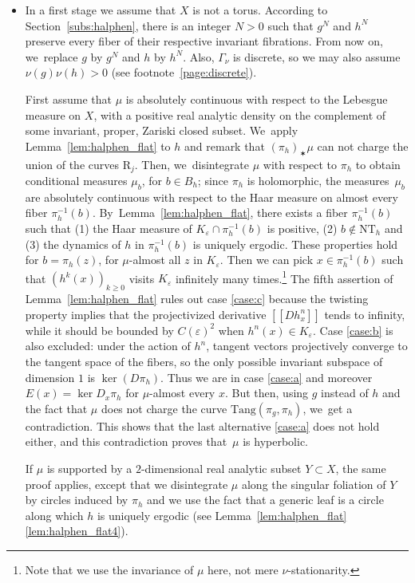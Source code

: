 \documentclass[JEP,XML,SOM,Unicode,published]{cedram}
\newcommand{\llbracket}{[\![}
\newcommand{\rrbracket}{]\!]}
\let\e\varepsilon
\newcommand{\inv}{^{-1}}
\newcommand{\Tang}{{\mathrm{Tang}}}
\theoremstyle{plain}
\theoremstyle{definition}
\begin{document}
\begin{itemize}
\item
In a first stage we assume that $X$ is not a torus. According to Section~\ref{subs:halphen}, there is an integer $N>0$ such that $g^N$ and $h^N$
preserve every fiber of their respective invariant fibrations. From now on, we~replace $g$ by $g^N$ and $h$ by $h^N$. Also, $\Gamma_\nu$ is discrete, so we may also assume $\nu(g)\nu(h)>0$ (see footnote~\ref{page:discrete}).

First assume that $\mu$ is absolutely continuous with respect to the Lebesgue measure on $X$, with a positive real analytic density
on the complement of some invariant, proper, Zariski closed subset. We~apply Lemma~\ref{lem:halphen_flat} to $h$ and remark that
$(\pi_h)_\varstar \mu$ can not charge the union of the curves $\mathrm R_j$. Then, we~disintegrate $\mu$ with respect to $\pi_h$ to obtain
conditional measures $\mu_b$, for $b\in B_h$; since $\pi_h$ is holomorphic, the measures~$\mu_b$ are
absolutely continuous with respect to the Haar measure on almost every fiber $\pi_h^{-1}(b)$. By~Lemma~\ref{lem:halphen_flat},
there exists a fiber $\pi_h\inv(b)$ such that (1) the Haar measure of
$K_\varepsilon \cap \pi_h\inv(b)$ is positive,
(2) $b \notin \mathrm{NT}_h$ and (3)
the dynamics of $h$ in $\pi_h\inv(b)$ is uniquely ergodic. These properties hold for $b=\pi_h(z)$, for $\mu$-almost all $z$ in $K_\e$.
Then we can pick $x\in \pi_h\inv(b)$ such that $(h^{k}(x))_{k\geq 0}$ visits $K_\e$ infinitely many times.\footnote{Note that we use the invariance of $\mu$ here, not mere $\nu$-stationarity.} The fifth assertion of Lemma~\ref{lem:halphen_flat}
rules out case \eqref{case:c} because the twisting property implies that the projectivized derivative $\llbracket Dh^n_x \rrbracket$ tends to infinity, while it should be bounded
by $C(\e)^2$ when $h^n(x)\in K_\e$.
Case \eqref{case:b} is also excluded: under the action of $h^n$, tangent vectors projectively
converge to the tangent space of the fibers, so the only possible invariant subspace of dimension $1$ is $\ker(D\pi_h)$.
Thus we are in case \eqref{case:a} and moreover $E(x) = \ker D_x\pi_h$ for $\mu$-almost every $x$. But then,
using $g$ instead of $h$ and the fact that $\mu$ does not charge the curve $\Tang(\pi_g, \pi_h)$, we~get a contradiction.
This shows that the last alternative \eqref{case:a} does not hold either, and this contradiction proves that~$\mu$ is hyperbolic.

If $\mu$ is supported by a $2$-dimensional real analytic subset $Y\subset X$, the same proof applies,
except that we disintegrate
$\mu$ along the singular foliation of $Y$ by circles induced by $\pi_h$ and we use the fact that a generic leaf is a
circle along which
$h$ is uniquely ergodic (see Lemma~\ref{lem:halphen_flat}\eqref{lem:halphen_flat4}).


\end{itemize}
\end{document}
